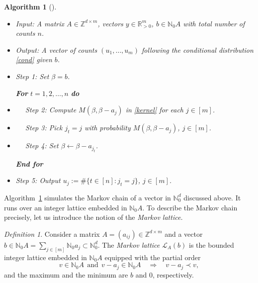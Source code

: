 \documentclass[a4paper,12pt]{article}
\theoremstyle{plain}
\newtheorem{algorithm}[theorem]{Algorithm}
\theoremstyle{remark}
\newtheorem{definition}[theorem]{Definition}
\begin{document}
\begin{algorithm}[\cite{Man17}]\label{algo:0}~
  \begin{itemize}
  \item[] Input: A matrix $A\in\mathbb{Z}^{d\times m}$,
    vectors $y\in\mathbb{R}_{>0}^m$,  $b\in\mathbb{N}_0A$
    with total number of counts $n$.
  \item[] Output: A vector of counts $(u_1,\ldots,u_m)$
    following the conditional distribution \eqref{cond} given
    $b$.     
  \end{itemize}    
  \begin{itemize}
      \item [] Step 1: Set $\beta=b$.

    \smallskip
    
    {\bf For} $t=1,2,\ldots,n$ {\bf do}

  \item [] ~~ Step 2: Compute $M(\beta,\beta-a_j)$ in \eqref{kernel}
    for each $j\in[m]$.

  \item [] ~~ Step 3: Pick $j_t=j$ with probability
    $M(\beta,\beta-a_j)$, $j\in[m]$.

  \item [] ~~ Step 4: Set $\beta\leftarrow \beta-a_{j_t}$.

    \smallskip
    
    {\bf End for}

  \item [] Step 5: Output $u_j:=\#\{t\in[n]:j_t=j\}$, $j\in[m]$.
  \end{itemize}
\end{algorithm}

Algorithm~\ref{algo:0} simulates the Markov chain of a vector in
$\mathbb{N}^d_0$ discussed above. It runs over an integer lattice
embedded in $\mathbb{N}_0A$. To describe the Markov chain
precisely, let us introduce the notion of the {\it Markov lattice.}

\begin{definition}
  Consider a matrix $A=(a_{ij})\in\mathbb{Z}^{d\times m}$ and
  a vector
  $b\in\mathbb{N}_0A=\sum_{j\in[m]}\mathbb{N}_0a_j\subset\mathbb{N}^d_0$.
  The {\it Markov lattice} $\mathcal{L}_A(b)$ is the bounded
  integer lattice embedded in $\mathbb{N}_0A$ equipped with
  the partial order
  \[
    v \in \mathbb{N}_0A~~\text{and}~~v-a_j \in \mathbb{N}_0A 
    \quad \Rightarrow \quad v-a_j \prec v,
  \]  
  and the maximum and the minimum are $b$ and $0$, respectively.
\end{definition}
\end{document}
